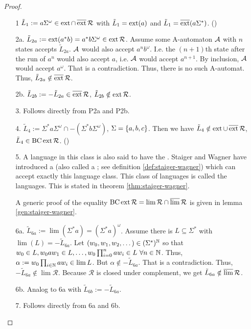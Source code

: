 \begin{lemma}
\begin{proof}
\begin{enumerate}
\item[1] $\tilde{L}_1 := a \Sigma^\omega \in \operatorname{ext} \cap \operatorname{\overline{ext}} \mathcal{R}$ with $\tilde{L}_1 = \operatorname{ext}(a)$ and $\tilde{L}_1 = \operatorname{\overline{ext}} (a \Sigma^*)$. (\cite[prop, p.38]{InfCompR101})
\item[2a.] $\tilde{L}_{2a} := \operatorname{ext}(a^* b) = a^* b \Sigma^\omega \in \operatorname{ext} \mathcal{R}$. Assume some A-automaton $\mathcal{A}$ with $n$ states accepts $\tilde{L}_{2a}$. $\mathcal{A}$ would also accept $a^n b^\omega$. I.e. the $(n+1)$th state after the run of $a^n$ would also accept $a$, i.e. $\mathcal{A}$ would accept $a^{n+1}$. By inclusion, $\mathcal{A}$ would accept $a^\omega$. That is a contradiction. Thus, there is no such A-automat. Thus, $\tilde{L}_{2a} \notin \operatorname{\overline{ext}} \mathcal{R}$.
\item[2b.] $\tilde{L}_{2b} := - \tilde{L}_{2a} \in \operatorname{\overline{ext}} \mathcal{R}$, $\tilde{L}_{2b} \notin \operatorname{ext} \mathcal{R}$.
\item[3.] Follows directly from P2a and P2b.
\item[4.] $\tilde{L}_4 := \Sigma^* a \Sigma^\omega \cap -(\Sigma^* b \Sigma^\omega)$, $\Sigma = \Set{a,b,c}$. Then we have $\tilde{L}_4 \notin \operatorname{ext} \cup \operatorname{\overline{ext}} \mathcal{R}$, $\tilde{L}_4 \in \operatorname{BC} \operatorname{ext} \mathcal{R}$. (\cite[p.38]{InfCompR101})

\item[5.]
A language in this class is also said to have the . Staiger and Wagner have introduced a  (also called a ; see definition \ref{def:staiger-wagner}) which can accept exactly this language class. This class of languages is called the  languages. This is stated in theorem \ref{thm:staiger-wagner}.


A generic proof of the equality $\operatorname{BC} \operatorname{ext} \mathcal{R} = \lim \mathcal{R} \cap \operatorname{\overline{lim}} \mathcal{R}$ is given in lemma \ref{gen:staiger-wagner}.

\item[6a.] $\tilde{L}_{6a} := \lim(\Sigma^* a) = (\Sigma^* a)^\omega$. Assume there is $L \subseteq \Sigma^*$ with $\lim(L) = -\tilde{L}_{6a}$. Let $(w_0,w_1,w_2,\dotsc) \in (\Sigma^*)^{\mathbb{N}}$ so that $w_0 \in L, w_0 a w_1 \in L, \dotsc, w_0 \prod_{i=0}^n a w_i \in L \ \forall n \in \mathbb{N}$. Thus, $\alpha := w_0 \prod_{i \in \mathbb{N}} a w_i \in \lim L$. But $\alpha \notin -\tilde{L}_{6a}$. That is a contradiction. Thus, $-\tilde{L}_{6a} \notin \lim \mathcal{R}$. Because $\mathcal{R}$ is closed under complement, we get $\tilde{L}_{6a} \notin \operatorname{\overline{lim}} \mathcal{R}$.
\item[6b.] Analog to 6a with $\tilde{L}_{6b} := -\tilde{L}_{6a}$.
\item[7.] Follows directly from 6a and 6b.


\end{enumerate}
\end{proof}
\end{lemma}

